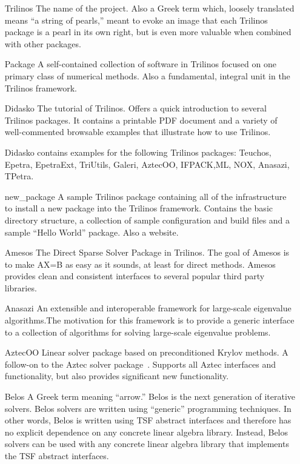 \begin{itemize}
\item[Trilinos]
The name of the project.  Also a Greek term which,
loosely translated means ``a string of pearls,'' 
meant to evoke an image that each Trilinos package is a pearl in its 
own right, but is even more valuable when combined with other 
packages.

\item[Package]
A self-contained collection of software in Trilinos
focused on one primary class of numerical
methods.  Also a fundamental, integral unit in the Trilinos framework.

\item[Didasko]
The tutorial of Trilinos.  Offers a quick introduction to several
Trilinos packages. It contains a printable PDF document and a
variety of well-commented browsable examples that illustrate how
to use Trilinos.

Didasko contains examples for the following Trilinos packages:
Teuchos, Epetra, EpetraExt, TriUtils, Galeri, AztecOO, IFPACK,ML,
NOX, Anasazi, TPetra.

\item[new\_package] A sample Trilinos package containing all of the
infrastructure to install a new package into the Trilinos framework.
Contains the basic directory structure, a collection of sample
configuration and build files and a sample ``Hello World'' package.
Also a website.

\item[Amesos]
The Direct Sparse Solver Package in Trilinos. The goal of
Amesos is to make AX=B as easy as it sounds, at least for direct
methods. Amesos provides clean and consistent interfaces to
several popular third party libraries.

\item[Anasazi]
An extensible and interoperable framework for large-scale eigenvalue
algorithms.The motivation for this framework is to provide a generic
interface to a collection of algorithms for solving large-scale 
eigenvalue problems.

\item[AztecOO] 
Linear solver package based on preconditioned Krylov methods.  A 
follow-on to the Aztec solver package~\cite{Aztec2.1}.  
Supports all Aztec 
interfaces and functionality, but also provides significant new 
functionality.

\item[Belos] A Greek term meaning ``arrow.'' Belos is the next
generation of iterative solvers.  Belos solvers are written using
``generic'' programming techniques.  In other words, Belos is written
using TSF abstract interfaces and therefore has no explicit dependence
on any concrete linear algebra library.  Instead, Belos solvers can be
used with any concrete linear algebra library that implements the TSF
abstract interfaces. 


\end{itemize}
